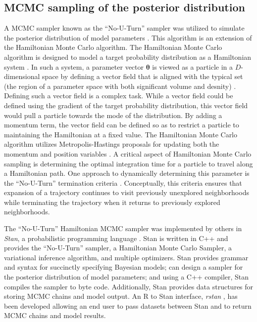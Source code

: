 \begin{DoubleSpace*}
\section{MCMC sampling of the posterior distribution}
A MCMC sampler known as the ``No-U-Turn'' sampler was utilized to simulate the posterior distribution of model parameters \cite{hoffman2014}. This algorithm is an extension of the Hamiltonian Monte Carlo algorithm. The Hamiltonian Monte Carlo algorithm is designed to model a target probability distribution as a Hamiltonian system \cite{betancourt2017}. In such a system, a parameter vector $\boldsymbol{\theta}$ is viewed as a particle in a $D$-dimensional space \cite{neal2011} by defining a vector field that is aligned with the typical set (the region of a parameter space with both significant volume and desnity) \cite{betancourt2017}. Defining such a vector field is a complex task. While a vector field could be defined using the gradient of the target probability distribution, this vector field would pull a particle towards the mode of the distribution. By adding a momentum term, the vector field can be defined so as to restrict a particle to maintaining the Hamiltonian at a fixed value. The Hamiltonian Monte Carlo algorithm utilizes Metropolis-Hastings proposals for updating both the momentum and position variables \cite{neal2011,betancourt2017}. A critical aspect of Hamiltonian Monte Carlo sampling is determining the optimal integration time for a particle to travel along a Hamiltonian path. One approach to dynamically determining this parameter is the ``No-U-Turn'' termination criteria \cite{hoffman2014,betancourt2017}. Conceptually, this criteria ensures that expansion of a trajectory continues to visit previously unexplored neighborhoods while terminating the trajectory when it returns to previously explored neighborhoods.

The ``No-U-Turn'' Hamiltonian MCMC sampler was implemented by others in \emph{Stan}, a probabilistic programming language \cite{carpenter2017}. Stan is written in C++ and provides the ``No-U-Turn'' sampler, a Hamiltonian Monte Carlo Sampler, a variational inference algorithm, and multiple optimizers. Stan provides grammar and syntax for succinctly specifying Bayesian models; can design a sampler for the posterior distribution of model parameters; and using a C++ compiler, Stan compiles the sampler to byte code. Additionally, Stan provides data structures for storing MCMC chains and model output. An R to Stan interface, \emph{rstan} \cite{stan2018}, has been developed allowing an end user to pass datasets between Stan and to return MCMC chains and model results. 


\end{DoubleSpace*}
